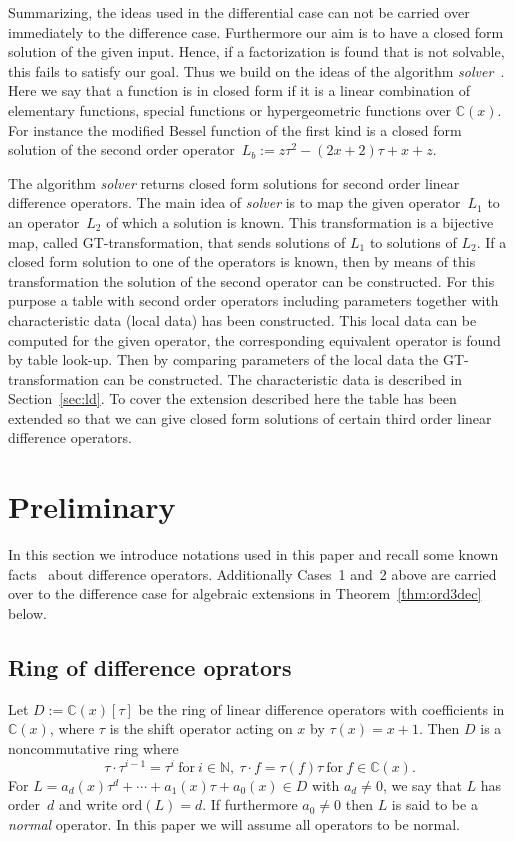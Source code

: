 \documentclass{article}
\newcommand{\C}{{\mathbb{C}}} \newcommand{\N}{{\mathbb{N}}}
\newcommand{\ord}{\mathrm{ord}}
\begin{document}
Summarizing, the ideas used in the differential case can not be carried over immediately to
the difference case. Furthermore our aim is to have a closed form solution of the given
input. Hence, if a factorization is found that is not solvable, this fails to satisfy our
goal. Thus we build on the ideas of the algorithm {\em solver}~\cite{YC11,CH09,CHG10}.
Here we say that a function is in closed form if it is a linear combination of elementary
functions, special functions or hypergeometric functions over $\C(x)$.  For instance the
modified Bessel function of the first kind is a closed form solution of the second order
operator~$L_b:=z\tau^2-(2x+2)\tau+x+z$.

The algorithm {\em solver} returns closed form solutions for second order linear
difference operators. The main idea of {\em solver} is to map the given operator~$L_1$ to
an operator~$L_2$ of which a solution is known. This transformation is a bijective map,
called GT-transformation, that sends solutions of $L_1$ to solutions of $L_2$. If a closed
form solution to one of the operators is known, then by means of this transformation the
solution of the second operator can be constructed. For this purpose a table with
second order operators including parameters together with characteristic data (local data)
has been constructed. This local data can be computed for the given operator, the
corresponding equivalent operator is found by table look-up. Then by comparing parameters
of the local data the GT-transformation can be constructed. The characteristic data is
described in Section~\ref{sec:ld}. To cover the extension described here the table has been extended 
so that we can give closed form solutions of certain third order linear difference operators.











\section{Preliminary}
In this section we introduce notations used in this paper and recall some known
facts~\cite{CH09, CHG10, AeqB, PS97} about difference operators. Additionally Cases~1
and~2 above are carried over to the difference case for algebraic extensions in
Theorem~\ref{thm:ord3dec} below.

\subsection{Ring of difference oprators}
Let $D:=\C(x)[\tau]$ be the ring of linear difference operators with coefficients in $\C(x)$, where $\tau$ is the shift
operator acting on $x$ by $ \tau(x)=x+1$. Then $D$ is a noncommutative ring where $$\tau
\cdot \tau^{i-1}=\tau^i \ \text{for} \ i \in \N, \ \tau \cdot f= \tau(f)\tau \ \text{for}
\ f \in \C(x).$$ For $L=a_d(x)\tau^d+\cdots+a_1(x)\tau+a_0(x) \in D$ with $a_d \neq 0$, we
say that $L$ has order~$d$ and write $\ord(L)=d$. If furthermore $a_0\ne0$ then $L$ is
said to be a {\em normal} operator.  In this paper we will assume all operators to be
normal.
\end{document}
